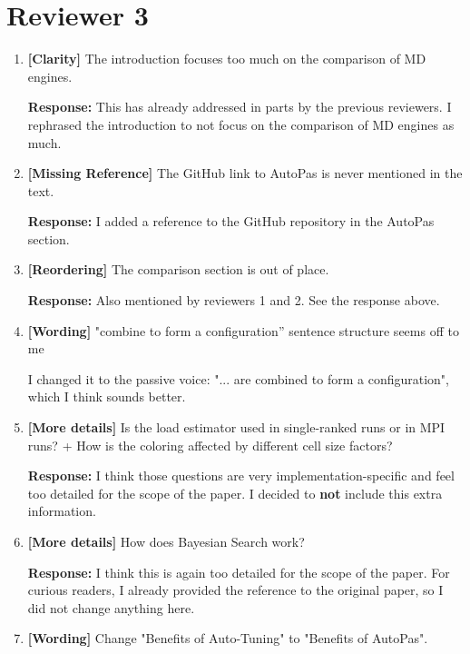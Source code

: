 \documentclass[12pt,a4paper]{article}
\begin{document}
\section*{Reviewer 3}

\begin{enumerate}[label=\textbf{Comment \arabic*:}, itemsep=0.8em]
      \item \textbf{[Clarity]} The introduction focuses too much on the comparison of MD engines.

            \textbf{Response:} This has already addressed in parts by the previous reviewers. I rephrased the introduction to not focus on the comparison of MD engines as much.

      \item \textbf{[Missing Reference]} The GitHub link to AutoPas is never mentioned in the text.

            \textbf{Response:} I added a reference to the GitHub repository in the AutoPas section.

      \item \textbf{[Reordering]} The comparison section is out of place.

            \textbf{Response:} Also mentioned by reviewers 1 and 2. See the response above.

      \item \textbf{[Wording]} "combine to form a configuration” sentence structure seems off to me

            I changed it to the passive voice: "... are combined to form a configuration", which I think sounds better.

      \item \textbf{[More details]} Is the load estimator used in single-ranked runs or in MPI runs? + How is the coloring affected by different cell size factors?

            \textbf{Response:} I think those questions are very implementation-specific and feel too detailed for the scope of the paper. I decided to \textbf{not} include this extra information.

      \item \textbf{[More details]} How does Bayesian Search work?

            \textbf{Response:} I think this is again too detailed for the scope of the paper. For curious readers, I already provided the reference to the original paper, so I did not change anything here.

      \item \textbf{[Wording]} Change "Benefits of Auto-Tuning" to "Benefits of AutoPas".


\end{enumerate}
\end{document}
